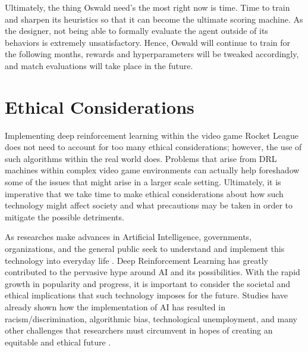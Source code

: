 \documentclass[10pt,twocolumn]{article}
\begin{document}
 Ultimately, the thing Oswald need's the most right now is 
 time. Time to train and sharpen its heuristics so that it 
 can become the ultimate scoring machine. As the designer, 
 not being able to formally evaluate the agent outside of its 
 behaviors is extremely unsatisfactory. Hence, Oswald will 
 continue to train for the following months, rewards and 
 hyperparameters will be tweaked accordingly, and match 
 evaluations will take place in the future. 


\section{Ethical Considerations}
 Implementing deep reinforcement learning within the video 
 game Rocket League does not need to account for too many 
 ethical considerations; however, the use of such algorithms 
 within the real world does. Problems that arise from DRL 
 machines within complex video game environments can actually 
 help foreshadow some of the issues that might arise in a 
 larger scale setting. Ultimately, it is imperative that we 
 take time to make ethical considerations about how such 
 technology might affect society and what precautions may be taken in order to mitigate the possible detriments.

 As researches make advances in Artificial Intelligence, 
 governments, organizations, and the general public seek to 
 understand and implement this technology into everyday life 
 \cite{SchiffBBL20}. Deep Reinforcement Learning has greatly 
 contributed to the pervasive hype around AI and its 
 possibilities. With the rapid growth in popularity and 
 progress, it is important to consider the societal and 
 ethical implications that such technology imposes for the 
 future. Studies have already shown how the implementation of 
 AI has resulted in racism/discrimination, algorithmic bias, 
 technological unemployment, and many other challenges that 
 researchers must circumvent in hopes of creating an 
 equitable and ethical future \cite{SchiffBBL20}.
\end{document}
